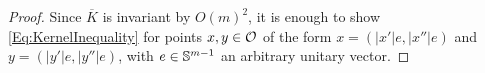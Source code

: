 \begin{proof}
Since $\overline{K}$ is invariant by $O(m)^2$, it is enough to show \eqref{Eq:KernelInequality} for points $x, y\in \mathcal{O}$ of the form $x = (|x'|e, |x''|e)$ and $y = (|y'|e, |y''|e)$, with $e \in \mathbb{S}^{m-1}$ an arbitrary unitary vector.



\end{proof}
